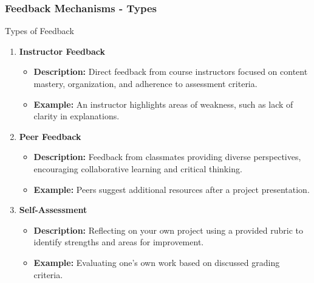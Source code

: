 \documentclass[aspectratio=169]{beamer}
\begin{document}
\begin{frame}[fragile]
    \frametitle{Feedback Mechanisms - Types}
    \begin{block}{Types of Feedback}
        \begin{enumerate}
            \item \textbf{Instructor Feedback}
                \begin{itemize}
                    \item \textbf{Description:} Direct feedback from course instructors focused on content mastery, organization, and adherence to assessment criteria.
                    \item \textbf{Example:} An instructor highlights areas of weakness, such as lack of clarity in explanations.
                \end{itemize}
            
            \item \textbf{Peer Feedback}
                \begin{itemize}
                    \item \textbf{Description:} Feedback from classmates providing diverse perspectives, encouraging collaborative learning and critical thinking.
                    \item \textbf{Example:} Peers suggest additional resources after a project presentation.
                \end{itemize}

            \item \textbf{Self-Assessment}
                \begin{itemize}
                    \item \textbf{Description:} Reflecting on your own project using a provided rubric to identify strengths and areas for improvement.
                    \item \textbf{Example:} Evaluating one's own work based on discussed grading criteria.
                \end{itemize}
        \end{enumerate}
    \end{block}
\end{frame}
\end{document}
